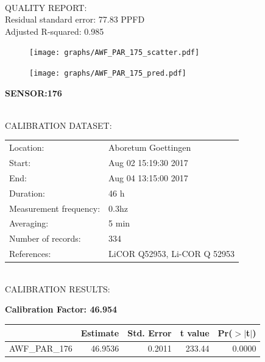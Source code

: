\documentclass[oneside]{report}
\begin{document}
\hrulefill\\
QUALITY REPORT:\\
Residual standard error: 77.83 PPFD\\
Adjusted R-squared: 0.985



\begin{figure}[H]
  \centering
  \texttt{[image: graphs/AWF\_PAR\_175\_scatter.pdf]}
\end{figure}




\begin{figure}[H]
  \centering
  \texttt{[image: graphs/AWF\_PAR\_175\_pred.pdf]}
\end{figure}

\pagebreak


\begin{center}
\large{\textbf{SENSOR:176}}\\
\end{center}

\hrulefill\\
CALIBRATION DATASET:\\
\begin{table}[h!]
  \centering
  \label{tab:table1}
  \begin{tabular}{ll}
    Location: & Aboretum Goettingen\\ 
    
    
    Start:  & Aug 02 15:19:30 2017 \\
    End:   & Aug 04 13:15:00 2017\\ 
    Duration: & 46 h\\
    Measurement frequency: & 0.3hz\\
    Averaging:  &5 min\\
    Number of records: & 334 \\
    References: & LiCOR Q52953, Li-COR Q 52953 \\
  \end{tabular}
\end{table}

\hrulefill\\
CALIBRATION RESULTS:\\


\begin{center}
\textbf{\large{Calibration Factor: 46.954}}\\
\end{center}
\begin{table}[ht]
\centering
\begin{tabular}{rrrrr}
  \hline
 & Estimate & Std. Error & t value & Pr($>$$|$t$|$) \\ 
  \hline
AWF\_PAR\_176 & 46.9536 & 0.2011 & 233.44 & 0.0000 \\ 
   \hline
\end{tabular}
\end{table}
\end{document}
